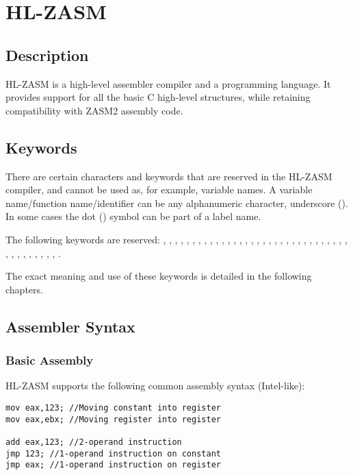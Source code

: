 \chapter{HL-ZASM}

\section{Description}
HL-ZASM is a high-level assembler compiler and a programming language. It provides support for all the basic C high-level structures, while retaining compatibility with ZASM2 assembly code.

\section{Keywords}
There are certain characters and keywords that are reserved in the HL-ZASM compiler, and cannot be used as, for example, variable names. A variable name/function name/identifier can be any alphanumeric character, underscore (\reg{\textunderscore}). In some cases the dot () symbol can be part of a label name.

The following keywords are reserved: 
, , , , , , , ,
, , , , , ,
, , , , , , ,
, , , , , , ,
, , , , , , ,
, , , , , , .

The exact meaning and use of these keywords is detailed in the following chapters.

\section{Assembler Syntax}
\subsection{Basic Assembly}
HL-ZASM supports the following common assembly syntax (Intel-like):
\begin{verbatim}
mov eax,123; //Moving constant into register
mov eax,ebx; //Moving register into register

add eax,123; //2-operand instruction
jmp 123; //1-operand instruction on constant
jmp eax; //1-operand instruction on register
\end{verbatim}

